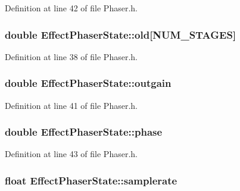 Definition at line 42 of file Phaser.\+h.

\subsubsection[{\texorpdfstring{old}{old}}]{\setlength{\rightskip}{0pt plus 5cm}double Effect\+Phaser\+State\+::old\mbox{[}{\bf N\+U\+M\+\_\+\+S\+T\+A\+G\+ES}\mbox{]}}\hypertarget{class_effect_phaser_state_ad68db3e9f0b8ead3a30ad93ae4c39473}{}\label{class_effect_phaser_state_ad68db3e9f0b8ead3a30ad93ae4c39473}


Definition at line 38 of file Phaser.\+h.

\subsubsection[{\texorpdfstring{outgain}{outgain}}]{\setlength{\rightskip}{0pt plus 5cm}double Effect\+Phaser\+State\+::outgain}\hypertarget{class_effect_phaser_state_a424a4328c25aa8835c6b149f5c772fa9}{}\label{class_effect_phaser_state_a424a4328c25aa8835c6b149f5c772fa9}


Definition at line 41 of file Phaser.\+h.

\subsubsection[{\texorpdfstring{phase}{phase}}]{\setlength{\rightskip}{0pt plus 5cm}double Effect\+Phaser\+State\+::phase}\hypertarget{class_effect_phaser_state_aae650dfadb8d14b4cbc2cfa2348f2f19}{}\label{class_effect_phaser_state_aae650dfadb8d14b4cbc2cfa2348f2f19}


Definition at line 43 of file Phaser.\+h.

\subsubsection[{\texorpdfstring{samplerate}{samplerate}}]{\setlength{\rightskip}{0pt plus 5cm}float Effect\+Phaser\+State\+::samplerate}\hypertarget{class_effect_phaser_state_adbc43c3b53f13bd9cefb34d169e82501}{}\label{class_effect_phaser_state_adbc43c3b53f13bd9cefb34d169e82501}


